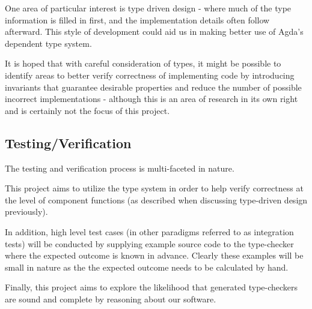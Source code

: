 One area of particular interest is type driven
design - where much of the type information is filled in
first, and the implementation details often follow
afterward. This style of development could aid us in making
better use of Agda's dependent type system.

It is hoped that with careful consideration of types, it might
be possible to identify areas to better verify correctness of
implementing code by introducing invariants that guarantee desirable
properties and reduce the number of possible incorrect
implementations - although this is an area of research in its
own right and is certainly not the focus of this project.

\subsection{Testing/Verification}

The testing and verification process is multi-faceted in
nature.

This project aims to utilize the type system in
order to help verify correctness at the level of component
functions (as described when discussing type-driven design
previously).

In addition, high level test cases (in other paradigms
referred to as integration tests) will be conducted by
supplying example source code to the type-checker where the
expected outcome is known in advance. Clearly these examples
will be small in nature as the the expected outcome needs to
be calculated by hand.

Finally, this project aims to explore the likelihood that generated
type-checkers are sound and complete by reasoning about our
software. 
